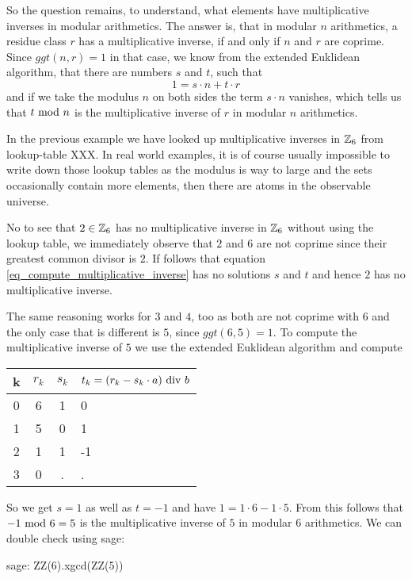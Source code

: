 So the question remains, to understand, what elements have multiplicative inverses in modular arithmetics. The answer is, that in modular $n$ arithmetics, a residue class $r$ has a multiplicative inverse, if and only if $n$ and $r$ are coprime. Since $ggt(n,r)=1$ in that case, we know from the extended Euklidean algorithm, that there are numbers $s$ and $t$, such that 
\begin{equation}
\label{eq_compute_multiplicative_inverse}
1 = s\cdot n + t\cdot r
\end{equation}
and if we take the modulus $n$ on both sides the term $s\cdot n$ vanishes, which tells us that $t \text{ mod } n$ is the multiplicative inverse of $r$ in modular $n$ arithmetics.
\begin{example} In the previous example we have looked up multiplicative inverses in $\mathbb{Z}_6$ from lookup-table XXX. In real world examples, it is of course usually impossible to write down those lookup tables as the modulus is way to large and the sets occasionally contain more elements, then there are atoms in the observable universe.

No to see that $2\in \mathbb{Z}_6$ has no multiplicative inverse in $\mathbb{Z}_6$ without using the lookup table, we immediately observe that $2$ and $6$ are not coprime since their greatest common divisor is $2$. If follows that equation \ref{eq_compute_multiplicative_inverse} has no solutions $s$ and $t$ and hence $2$ has no multiplicative inverse.

The same reasoning works for $3$ and $4$, too as both are not coprime with $6$ and the only case that is different is $5$, since $ggt(6,5)=1$. To compute the multiplicative inverse of $5$ we use the extended Euklidean algorithm and compute   
\begin{center}
  \begin{tabular}{c | c c l}
    k & $ r_k $ & $ s_k $ & $ t_k = (r_k-s_k \cdot a) \text{ div } b $ \\\hline
    0 & 6 & 1 & 0 \\
    1 & 5 & 0 & 1 \\
    2 & 1 & 1 & -1 \\
    3 & 0 & . & . \\
  \end{tabular}
\end{center}
So we get $s=1$ as well as $t=-1$ and have $1 = 1\cdot 6 -1\cdot 5$. From this follows that $-1 \text{ mod } 6=5$ is the multiplicative inverse of $5$ in modular $6$ arithmetics. We can double check using sage:
\begin{sagecommandline}
sage: ZZ(6).xgcd(ZZ(5))
\end{sagecommandline}
\end{example}
